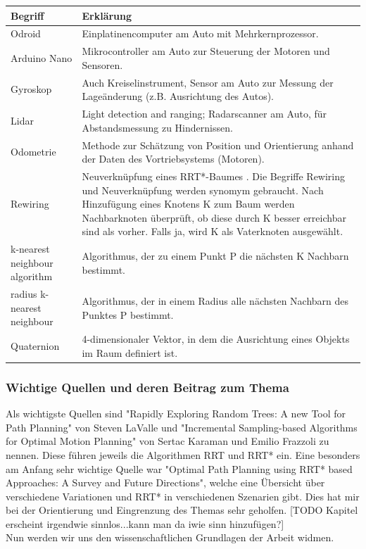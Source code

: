 \begin{tabularx}{\textwidth}{l|X}
 \textbf{Begriff}  & \textbf{Erklärung}  \\
\hline 
Odroid & Einplatinencomputer am Auto mit Mehrkernprozessor. \\
Arduino Nano & Mikrocontroller am Auto zur Steuerung der Motoren und Sensoren.\\
Gyroskop & Auch Kreiselinstrument, Sensor am Auto zur Messung der Lageänderung (z.B. Ausrichtung des Autos).\\
Lidar & Light detection and ranging; Radarscanner am Auto, für Abstandsmessung zu Hindernissen.\\
Odometrie & Methode zur Schätzung von Position und Orientierung anhand der Daten des Vortriebsystems (Motoren).\\
Rewiring & Neuverknüpfung eines RRT*-Baumes \citep{KaFra10}. Die Begriffe Rewiring und Neuverknüpfung werden synomym gebraucht. Nach Hinzufügung eines Knotens K zum Baum werden Nachbarknoten überprüft, ob diese durch K besser erreichbar sind als vorher. Falls ja, wird K als Vaterknoten ausgewählt. \\
k-nearest neighbour algorithm & Algorithmus, der zu einem Punkt P die nächsten K Nachbarn bestimmt.\\
radius k-nearest neighbour & Algorithmus, der in einem Radius alle nächsten Nachbarn des Punktes P bestimmt.\\
Quaternion & 4-dimensionaler Vektor, in dem die Ausrichtung eines Objekts im Raum definiert ist.\\
\end{tabularx}
\subsubsection{Wichtige Quellen und deren Beitrag zum Thema}
Als wichtigste Quellen sind "Rapidly Exploring Random Trees: A new Tool for Path Planning"\citep{Lav98} von Steven LaValle und "Incremental Sampling-based Algorithms for Optimal Motion Planning" \citep{KaFra10} von Sertac Karaman und Emilio Frazzoli zu nennen. Diese führen jeweils die Algorithmen RRT und RRT* ein. Eine besonders am Anfang sehr wichtige Quelle war "Optimal Path Planning using RRT* based Approaches: A Survey and Future Directions"\citep{NoKhaHa16}, welche eine Übersicht über verschiedene Variationen und RRT* in verschiedenen Szenarien gibt. Dies hat mir bei der Orientierung und Eingrenzung des Themas sehr geholfen. [TODO Kapitel erscheint irgendwie sinnlos...kann man da iwie sinn hinzufügen?]\\
Nun werden wir uns den wissenschaftlichen Grundlagen der Arbeit widmen.

